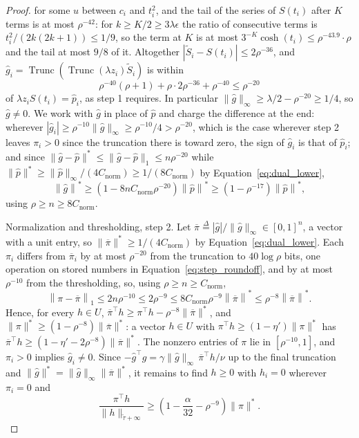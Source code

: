 \documentclass[11pt]{article}
\newcommand{\Trunc}{\operatorname{Trunc}}
\newcommand{\tautil}{\widetilde{\tau}}
\newcommand{\ghat}{\widehat{g}}
\newcommand{\defeq}{\stackrel{\Delta}{=}}
\newcommand{\Cnorm}{C_{\mathrm{norm}}}
\begin{document}
\begin{proof}
for some $u$ between
$c_i$ and
$t_i^{2}$, and the tail of the series of
$S(t_i)$ after
$K$ terms is at most
$\rho^{-42}$: for
$k \ge K / 2 \ge 3 \lambda \epsilon$ the ratio of consecutive terms is
$t_i^{2} / (2k (2k + 1)) \le 1/9$, so the term at
$K$ is at most
$3^{-K} \cosh(t_i) \le \rho^{-43.9} \cdot \rho$ and the tail at most
$9/8$ of it.
Altogether $|\widetilde{S}_i - S(t_i)| \le 2 \rho^{-36}$, and
$\ghat_i = \Trunc(\Trunc(\lambda z_i) \widetilde{S}_i)$ is within
\[
\rho^{-40} \left( \rho + 1 \right) + \rho \cdot 2 \rho^{-36} + \rho^{-40}
\le
\rho^{-20}
\]
of $\lambda z_i S(t_i) = \widehat{p}_i$, as step 1 requires.
In particular $\|\ghat\|_{\infty} \ge \lambda / 2 - \rho^{-20} \ge 1/4$, so
$\ghat \ne 0$.
We work with $\ghat$ in place of
$\widehat{p}$ and charge the difference at the end: wherever
$|\ghat_i| \ge \rho^{-10} \|\ghat\|_{\infty} \ge \rho^{-10} / 4 > \rho^{-20}$,
which is the case wherever step 2 leaves $\pi_i > 0$ since the truncation there
is toward zero, the sign of $\ghat_i$ is that of
$\widehat{p}_i$; and since
$\|\ghat - \widehat{p}\|^{*} \le \|\ghat - \widehat{p}\|_1 \le n \rho^{-20}$
while
$\|\widehat{p}\|^{*} \ge \|\widehat{p}\|_{\infty} / (4 \Cnorm) \ge 1 / (8 \Cnorm)$
by Equation~\eqref{eq:dual_lower},
\[
\left\| \ghat \right\|^{*}
\ge
\left( 1 - 8 n \Cnorm \rho^{-20} \right) \left\| \widehat{p} \right\|^{*}
\ge
\left( 1 - \rho^{-17} \right) \left\| \widehat{p} \right\|^{*},
\]
using $\rho \ge n \ge 8 \Cnorm$.

Normalization and thresholding, step 2.
Let $\overline{\pi} \defeq |\ghat| / \|\ghat\|_{\infty} \in [0, 1]^{n}$, a
vector with a unit entry, so $\|\overline{\pi}\|^{*} \ge 1 / (4 \Cnorm)$ by
Equation~\eqref{eq:dual_lower}.
Each $\pi_i$ differs from
$\overline{\pi}_i$ by at most
$\rho^{-20}$ from the truncation to
$40 \log \rho$ bits, one operation on stored numbers in
Equation~\eqref{eq:step_roundoff}, and by at most $\rho^{-10}$ from the
thresholding, so, using $\rho \ge n \ge \Cnorm$,
\[
\left\| \pi - \overline{\pi} \right\|_1
\le
2 n \rho^{-10}
\le
2 \rho^{-9}
\le
8 \Cnorm \rho^{-9} \left\| \overline{\pi} \right\|^{*}
\le
\rho^{-8} \left\| \overline{\pi} \right\|^{*} .
\]
Hence, for every $h \in U$,
$\overline{\pi}^\top h \ge \pi^\top h - \rho^{-8} \|\overline{\pi}\|^{*}$, and
$\|\pi\|^{*} \ge (1 - \rho^{-8}) \|\overline{\pi}\|^{*}$: a vector
$h \in U$ with
$\pi^\top h \ge (1 - \eta') \|\pi\|^{*}$ has
$\overline{\pi}^\top h \ge (1 - \eta' - 2 \rho^{-8}) \|\overline{\pi}\|^{*}$.
The nonzero entries of $\pi$ lie in
$[\rho^{-10}, 1]$, and
$\pi_i > 0$ implies
$\ghat_i \ne 0$.
Since $-\ghat^\top g = \gamma \|\ghat\|_{\infty} \, \overline{\pi}^\top h / \nu$
up to the final truncation and
$\|\ghat\|^{*} = \|\ghat\|_{\infty} \|\overline{\pi}\|^{*}$, it remains to find
$h \ge 0$ with
$h_i = 0$ wherever
$\pi_i = 0$ and
\begin{equation}
\label{eq:direction_goal}
\frac{\pi^\top h}{\|h\|_{\tautil + \infty}}
\ge
\left( 1 - \frac{\alpha}{32} - \rho^{-9} \right) \|\pi\|^{*} .
\end{equation}


\end{proof}
\end{document}
